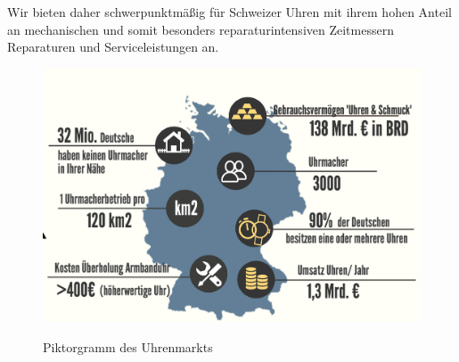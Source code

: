 Wir bieten daher schwerpunktmäßig für Schweizer Uhren mit ihrem hohen Anteil an mechanischen und somit besonders reparaturintensiven Zeitmessern Reparaturen und Serviceleistungen an.

\begin{figure}[!h]
	\centering
	\includegraphics[scale=0.2]{statistiken/uhrenmarkt_info.png}
	\label{fig:abb1}
	\caption{Piktorgramm des Uhrenmarkts} 
\end{figure}

